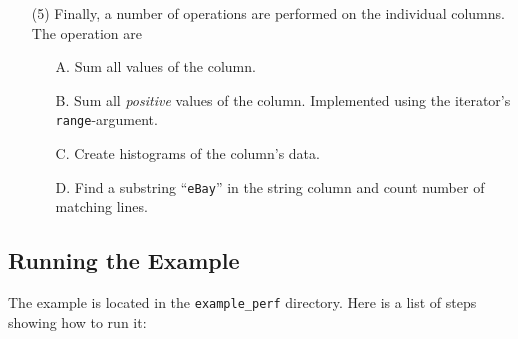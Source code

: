 \documentclass[a4paper]{article}
\begin{document}
\begin{enumerate}
  \item[(5)]  Finally, a number of operations are performed on the
    individual columns.  The operation are
    \begin{itemize}
    \item[A.] Sum all values of the column.
    \item[B.] Sum all \textsl{positive} values of the column.
      Implemented using the iterator's \texttt{range}-argument.
    \item[C.] Create histograms of the column's data.
    \item[D.] Find a substring ``\texttt{eBay}'' in the string column
      and count number of matching lines.

    \end{itemize}

\end{enumerate}


\subsection*{Running the Example}
The example is located in the \texttt{example\_perf} directory.  Here
is a list of steps showing how to run it:
\end{document}
